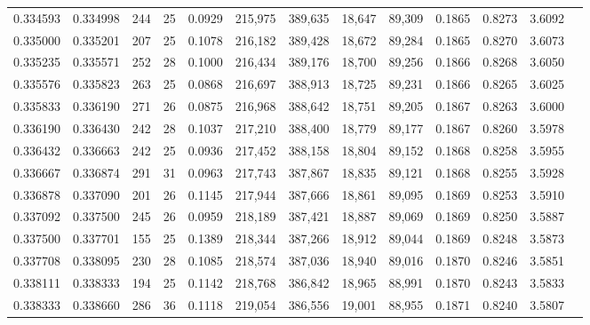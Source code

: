 \begin{tabular}{rrrrrrrrrrrrr}
0.334593 & 0.334998 &    244 &    25 &                                     0.0929 & 215,975 & 389,635 &  18,647 &  89,309 & 0.1865 & 0.8273 & 3.6092 \\
0.335000 & 0.335201 &    207 &    25 &                                     0.1078 & 216,182 & 389,428 &  18,672 &  89,284 & 0.1865 & 0.8270 & 3.6073 \\
0.335235 & 0.335571 &    252 &    28 &                                     0.1000 & 216,434 & 389,176 &  18,700 &  89,256 & 0.1866 & 0.8268 & 3.6050 \\
0.335576 & 0.335823 &    263 &    25 &                                     0.0868 & 216,697 & 388,913 &  18,725 &  89,231 & 0.1866 & 0.8265 & 3.6025 \\
0.335833 & 0.336190 &    271 &    26 &                                     0.0875 & 216,968 & 388,642 &  18,751 &  89,205 & 0.1867 & 0.8263 & 3.6000 \\
0.336190 & 0.336430 &    242 &    28 &                                     0.1037 & 217,210 & 388,400 &  18,779 &  89,177 & 0.1867 & 0.8260 & 3.5978 \\
0.336432 & 0.336663 &    242 &    25 &                                     0.0936 & 217,452 & 388,158 &  18,804 &  89,152 & 0.1868 & 0.8258 & 3.5955 \\
0.336667 & 0.336874 &    291 &    31 &                                     0.0963 & 217,743 & 387,867 &  18,835 &  89,121 & 0.1868 & 0.8255 & 3.5928 \\
0.336878 & 0.337090 &    201 &    26 &                                     0.1145 & 217,944 & 387,666 &  18,861 &  89,095 & 0.1869 & 0.8253 & 3.5910 \\
0.337092 & 0.337500 &    245 &    26 &                                     0.0959 & 218,189 & 387,421 &  18,887 &  89,069 & 0.1869 & 0.8250 & 3.5887 \\
0.337500 & 0.337701 &    155 &    25 &                                     0.1389 & 218,344 & 387,266 &  18,912 &  89,044 & 0.1869 & 0.8248 & 3.5873 \\
0.337708 & 0.338095 &    230 &    28 &                                     0.1085 & 218,574 & 387,036 &  18,940 &  89,016 & 0.1870 & 0.8246 & 3.5851 \\
0.338111 & 0.338333 &    194 &    25 &                                     0.1142 & 218,768 & 386,842 &  18,965 &  88,991 & 0.1870 & 0.8243 & 3.5833 \\
0.338333 & 0.338660 &    286 &    36 &                                     0.1118 & 219,054 & 386,556 &  19,001 &  88,955 & 0.1871 & 0.8240 & 3.5807 \\

\end{tabular}
